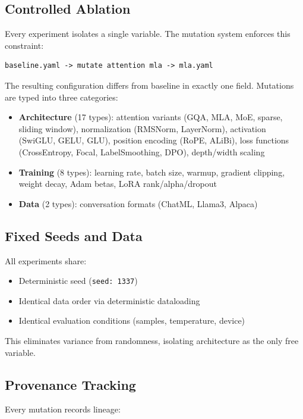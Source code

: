 \documentclass{article}
\begin{document}
\subsection{Controlled Ablation}

Every experiment isolates a single variable. The mutation system enforces this constraint:

\begin{lstlisting}
baseline.yaml -> mutate attention mla -> mla.yaml
\end{lstlisting}

The resulting configuration differs from baseline in exactly one field. Mutations are typed into three categories:

\begin{itemize}
  \item \textbf{Architecture} (17 types): attention variants (GQA, MLA, MoE, sparse, sliding window), normalization (RMSNorm, LayerNorm), activation (SwiGLU, GELU, GLU), position encoding (RoPE, ALiBi), loss functions (CrossEntropy, Focal, LabelSmoothing, DPO), depth/width scaling
  \item \textbf{Training} (8 types): learning rate, batch size, warmup, gradient clipping, weight decay, Adam betas, LoRA rank/alpha/dropout
  \item \textbf{Data} (2 types): conversation formats (ChatML, Llama3, Alpaca)
\end{itemize}

\subsection{Fixed Seeds and Data}

All experiments share:
\begin{itemize}
  \item Deterministic seed (\texttt{seed: 1337})
  \item Identical data order via deterministic dataloading
  \item Identical evaluation conditions (samples, temperature, device)
\end{itemize}

This eliminates variance from randomness, isolating architecture as the only free variable.

\subsection{Provenance Tracking}

Every mutation records lineage:
\end{document}
